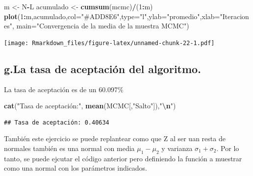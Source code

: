 \documentclass[
]{article}
\newenvironment{Shaded}{\begin{snugshade}}{\end{snugshade}}
\newcommand{\AttributeTok}[1]{\textcolor[rgb]{0.13,0.29,0.53}{#1}}
\newcommand{\DecValTok}[1]{\textcolor[rgb]{0.00,0.00,0.81}{#1}}
\newcommand{\FunctionTok}[1]{\textcolor[rgb]{0.13,0.29,0.53}{\textbf{#1}}}
\newcommand{\NormalTok}[1]{#1}
\newcommand{\OtherTok}[1]{\textcolor[rgb]{0.56,0.35,0.01}{#1}}
\newcommand{\SpecialCharTok}[1]{\textcolor[rgb]{0.81,0.36,0.00}{\textbf{#1}}}
\newcommand{\StringTok}[1]{\textcolor[rgb]{0.31,0.60,0.02}{#1}}
\begin{document}
\begin{Shaded}
\begin{Highlighting}[]
\NormalTok{m }\OtherTok{\textless{}{-}}\NormalTok{ N}\SpecialCharTok{{-}}\NormalTok{L }
\NormalTok{acumulado }\OtherTok{\textless{}{-}} \FunctionTok{cumsum}\NormalTok{(mcmc)}\SpecialCharTok{/}\NormalTok{(}\DecValTok{1}\SpecialCharTok{:}\NormalTok{m) }
\FunctionTok{plot}\NormalTok{(}\DecValTok{1}\SpecialCharTok{:}\NormalTok{m,acumulado,}\AttributeTok{col=}\StringTok{"\#ADD8E6"}\NormalTok{,}\AttributeTok{type=}\StringTok{"l"}\NormalTok{,}\AttributeTok{ylab=}\StringTok{"promedio"}\NormalTok{,}\AttributeTok{xlab=}\StringTok{"Iteraciones"}\NormalTok{, }
     \AttributeTok{main=}\StringTok{"Convergencia de la media de la muestra MCMC"}\NormalTok{)}
\end{Highlighting}
\end{Shaded}

\texttt{[image: Rmarkdown\_files/figure-latex/unnamed-chunk-22-1.pdf]}

\hypertarget{g.la-tasa-de-aceptaciuxf3n-del-algoritmo.}{%
\subsection{g.La tasa de aceptación del
algoritmo.}\label{g.la-tasa-de-aceptaciuxf3n-del-algoritmo.}}

La tasa de aceptación es de un 60.097\(\%\)

\begin{Shaded}
\begin{Highlighting}[]
\FunctionTok{cat}\NormalTok{(}\StringTok{"Tasa de aceptación:"}\NormalTok{, }\FunctionTok{mean}\NormalTok{(MCMC[,}\StringTok{"Salto"}\NormalTok{]),}\StringTok{"}\SpecialCharTok{\textbackslash{}n}\StringTok{"}\NormalTok{)}
\end{Highlighting}
\end{Shaded}

\begin{verbatim}
## Tasa de aceptación: 0.40634
\end{verbatim}

También este ejercicio se puede replantear como que Z al ser uan resta
de normales también es una normal con media \(\mu_1 - \mu_2\) y varianza
\(\sigma_1 + \sigma_2\). Por lo tanto, se puede ejcutar el código
anterior pero definiendo la función a muestrar como una normal con los
parámetros indicados.
\end{document}
